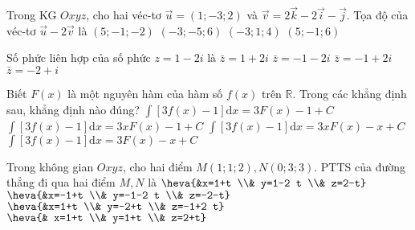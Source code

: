 \begin{ex}%
	Trong KG $Oxyz$, cho hai véc-tơ $\vec{u}=(1 ;-3 ; 2)$ và $\vec{v}=2 \vec{k}-2 \vec{i}-\vec{j}$. Tọa độ của véc-tơ $\vec{u}-2\vec{v}$ là
	\choice
	{\True $(5 ;-1 ;-2)$}
	{ $(-3 ;-5 ; 6)$}
	{ $(-3 ; 1 ; 4)$}
	{ $(5 ;-1 ; 6)$}
\end{ex}

\begin{ex}%
	Số phức liên hợp của số phức $z=1-2i$ là
	\choice
	{\True $\bar{z}=1+2 i$}
	{ $\bar{z}=-1-2 i$}
	{ $\bar{z}=-1+2 i$}
	{ $\bar{z}=-2+i$}
\end{ex}

\begin{ex}%
	Biết $F(x)$ là một nguyên hàm của hàm số $f(x)$ trên $\mathbb{R}$. Trong các khẳng định sau, khẳng định nào đúng?
	\choice
	{ $\displaystyle\int\limits[3f(x)-1] \mathrm{d}x=3F(x)-1+C$}
	{ $\displaystyle\int\limits[3f(x)-1] \mathrm{d}x=3xF(x)-1+C$}
	{ $\displaystyle\int\limits[3f(x)-1] \mathrm{d}x=3xF(x)-x+C$}
	{ \True$\displaystyle\int\limits[3f(x)-1] \mathrm{d}x=3F(x)-x+C$}
\end{ex}

\begin{ex}%
	Trong không gian $O x y z$, cho hai điểm $M(1;1;2), N(0;3;3)$. PTTS của đường thẳng đi qua hai điểm $M, N$ là
	\choice
	{\True $\heva{&x=1+t \\& y=1-2 t \\& z=2-t}$}
	{$\heva{&x=-1+t \\& y=-1-2 t \\& z=-2-t}$}
	{ $\heva{&x=1+t \\& y=-2+t \\& z=-1+2 t}$}
	{ $ \heva{& x=1+t \\& y=1+t \\& z=2+t}$}
\end{ex}

